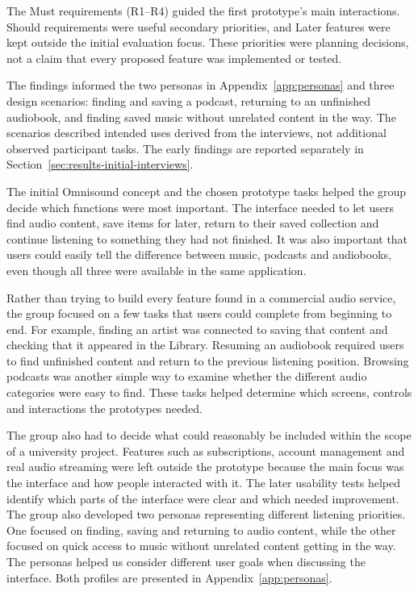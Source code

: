 The Must requirements (R1--R4) guided the first prototype's main
interactions. Should requirements were useful secondary priorities, and
Later features were kept outside the initial evaluation focus. These
priorities were planning decisions, not a claim that every proposed
feature was implemented or tested.

The findings informed the two personas in Appendix~\ref{app:personas}
and three design scenarios: finding and saving a podcast, returning to
an unfinished audiobook, and finding saved music without unrelated
content in the way. The scenarios described intended uses derived
from the interviews, not additional observed participant tasks.
The early findings are reported separately in
Section~\ref{sec:results-initial-interviews}.

The initial Omnisound concept and the chosen prototype tasks helped the group decide which functions were most important. The interface needed to let users find audio content, save items for later, return to their saved collection and continue listening to something they had not finished. It was also important that users could easily tell the difference between music, podcasts and audiobooks, even though all three were available in the same application.

Rather than trying to build every feature found in a commercial audio service, the group focused on a few tasks that users could complete from beginning to end. For example, finding an artist was connected to saving that content and checking that it appeared in the Library. Resuming an audiobook required users to find unfinished content and return to the previous listening position. Browsing podcasts was another simple way to examine whether the different audio categories were easy to find. These tasks helped determine which screens, controls and interactions the prototypes needed.

The group also had to decide what could reasonably be included within the scope of a university project. Features such as subscriptions, account management and real audio streaming were left outside the prototype because the main focus was the interface and how people interacted with it. The later usability tests helped identify which parts of the interface were clear and which needed improvement. The group also developed two personas representing different listening priorities. One focused on finding, saving and returning to audio content, while the other focused on quick access to music without unrelated content getting in the way. The personas helped us consider different user goals when discussing the interface. Both profiles are presented in Appendix~\ref{app:personas}.

